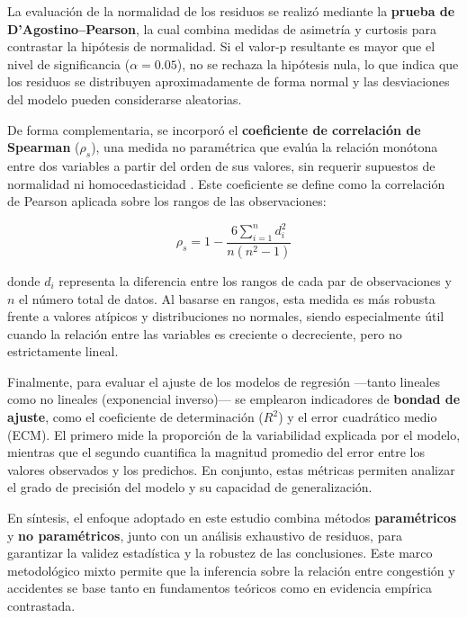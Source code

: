 \documentclass[12pt]{article}
\begin{document}
La evaluación de la normalidad de los residuos se realizó mediante la \textbf{prueba de D’Agostino–Pearson}, la cual combina medidas de asimetría y curtosis para contrastar la hipótesis de normalidad. Si el valor-p resultante es mayor que el nivel de significancia (\( \alpha = 0.05 \)), no se rechaza la hipótesis nula, lo que indica que los residuos se distribuyen aproximadamente de forma normal y las desviaciones del modelo pueden considerarse aleatorias.

De forma complementaria, se incorporó el \textbf{coeficiente de correlación de Spearman} (\( \rho_s \)), una medida no paramétrica que evalúa la relación monótona entre dos variables a partir del orden de sus valores, sin requerir supuestos de normalidad ni homocedasticidad \parencite{field2018}. Este coeficiente se define como la correlación de Pearson aplicada sobre los rangos de las observaciones:

\begin{equation}
\rho_s = 1 - \frac{6 \sum_{i=1}^{n} d_i^2}{n(n^2 - 1)}
\end{equation}

donde \( d_i \) representa la diferencia entre los rangos de cada par de observaciones y \( n \) el número total de datos. Al basarse en rangos, esta medida es más robusta frente a valores atípicos y distribuciones no normales, siendo especialmente útil cuando la relación entre las variables es creciente o decreciente, pero no estrictamente lineal.

Finalmente, para evaluar el ajuste de los modelos de regresión —tanto lineales como no lineales (exponencial inverso)— se emplearon indicadores de \textbf{bondad de ajuste}, como el coeficiente de determinación (\( R^2 \)) y el error cuadrático medio (ECM). El primero mide la proporción de la variabilidad explicada por el modelo, mientras que el segundo cuantifica la magnitud promedio del error entre los valores observados y los predichos. En conjunto, estas métricas permiten analizar el grado de precisión del modelo y su capacidad de generalización.

En síntesis, el enfoque adoptado en este estudio combina métodos \textbf{paramétricos} y \textbf{no paramétricos}, junto con un análisis exhaustivo de residuos, para garantizar la validez estadística y la robustez de las conclusiones. Este marco metodológico mixto permite que la inferencia sobre la relación entre congestión y accidentes se base tanto en fundamentos teóricos como en evidencia empírica contrastada.
\end{document}
